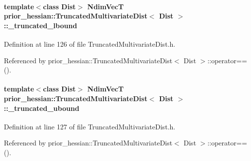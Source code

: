 \paragraph[{\texorpdfstring{\+\_\+truncated\+\_\+lbound}{_truncated_lbound}}]{\setlength{\rightskip}{0pt plus 5cm}template$<$class Dist$>$ Ndim\+VecT {\bf prior\+\_\+hessian\+::\+Truncated\+Multivariate\+Dist}$<$ Dist $>$\+::\+\_\+truncated\+\_\+lbound\hspace{0.3cm}{\ttfamily [protected]}}\hypertarget{classprior__hessian_1_1TruncatedMultivariateDist_a643aef19d581cabbc890ddda4dc7077f}{}\label{classprior__hessian_1_1TruncatedMultivariateDist_a643aef19d581cabbc890ddda4dc7077f}


Definition at line 126 of file Truncated\+Multivariate\+Dist.\+h.



Referenced by prior\+\_\+hessian\+::\+Truncated\+Multivariate\+Dist$<$ Dist $>$\+::operator==().

\paragraph[{\texorpdfstring{\+\_\+truncated\+\_\+ubound}{_truncated_ubound}}]{\setlength{\rightskip}{0pt plus 5cm}template$<$class Dist$>$ Ndim\+VecT {\bf prior\+\_\+hessian\+::\+Truncated\+Multivariate\+Dist}$<$ Dist $>$\+::\+\_\+truncated\+\_\+ubound\hspace{0.3cm}{\ttfamily [protected]}}\hypertarget{classprior__hessian_1_1TruncatedMultivariateDist_abeef4b19f31c7c704ec6688ffa8f5d68}{}\label{classprior__hessian_1_1TruncatedMultivariateDist_abeef4b19f31c7c704ec6688ffa8f5d68}


Definition at line 127 of file Truncated\+Multivariate\+Dist.\+h.



Referenced by prior\+\_\+hessian\+::\+Truncated\+Multivariate\+Dist$<$ Dist $>$\+::operator==().

